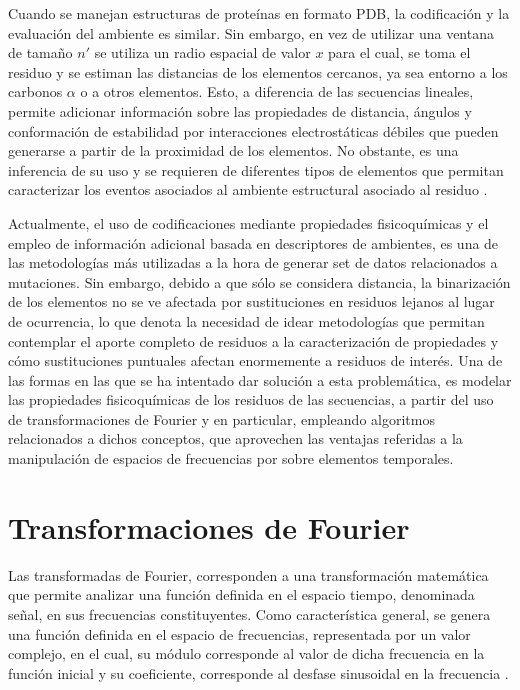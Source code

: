 Cuando se manejan estructuras de proteínas en formato PDB, la codificación y la evaluación del ambiente es similar. Sin embargo, en vez de utilizar una ventana de tamaño $n'$ se utiliza un radio espacial de valor $x$ para el cual, se toma el residuo y se estiman las distancias de los elementos cercanos, ya sea entorno a los carbonos $\alpha$ o a otros elementos. Esto, a diferencia de las secuencias lineales, permite adicionar información sobre las propiedades de distancia, ángulos y conformación de estabilidad por interacciones electrostáticas débiles que pueden generarse a partir de la proximidad de los elementos. No obstante, es una inferencia de su uso y se requieren de diferentes tipos de elementos que permitan caracterizar los eventos asociados al ambiente estructural asociado al residuo \cite{capriotti2008three}.

Actualmente, el uso de codificaciones mediante propiedades fisicoquímicas y el empleo de información adicional basada en descriptores de ambientes, es una de las metodologías más utilizadas a la hora de generar set de datos relacionados a mutaciones. Sin embargo, debido a que sólo se considera distancia, la binarización de los elementos no se ve afectada por sustituciones en residuos lejanos al lugar de ocurrencia, lo que denota la necesidad de idear metodologías que permitan contemplar el aporte completo de residuos a la caracterización de propiedades y cómo sustituciones puntuales afectan enormemente a residuos de interés. Una de las formas en las que se ha intentado dar solución a esta problemática, es modelar las propiedades fisicoquímicas de los residuos de las secuencias, a partir del uso de transformaciones de Fourier y en particular, empleando algoritmos relacionados a dichos conceptos, que aprovechen las ventajas referidas a la manipulación de espacios de frecuencias por sobre elementos temporales.

\section{Transformaciones de Fourier}

Las transformadas de Fourier, corresponden a una transformación matemática que permite analizar una función definida en el espacio tiempo, denominada señal, en sus frecuencias constituyentes. Como característica general, se genera una función definida en el espacio de frecuencias, representada por un valor complejo, en el cual, su módulo corresponde al valor de dicha frecuencia en la función inicial y su coeficiente, corresponde al desfase sinusoidal en la frecuencia \cite{sneddon1995fourier}.

